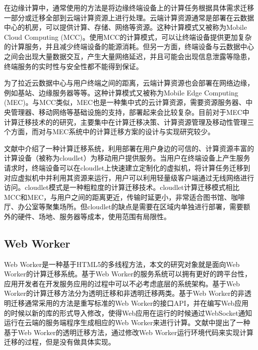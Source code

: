 在边缘计算中，通常使用的方法是将边缘终端设备上的计算任务根据具体需求迁移一部分或迁移全部到云端计算资源上进行处理。云端计算资源通常是部署在云数据中心的机房，可以提供计算、存储、网络等资源。这种计算模式又被称为Mobile Cloud Computing (MCC)\cite{barbarossa2014communicating}。使用MCC的计算模式，可以让终端设备提供更加复杂的计算服务，并且减少终端设备的能源消耗。但另一方面，终端设备与云数据中心之间会出现大量数据交互，产生大量网络延迟，并且可能会出现信息泄露等隐患，终端服务的实时性与安全性都不能得到保证\cite{shi2016edge}。

为了拉近云数据中心与用户终端之间的距离，云端计算资源也会部署在网络边缘，例如基站、边缘服务器等等。这种计算模式又被称为Mobile Edge Computing (MEC)\cite{董浩2019移动边缘计算环境下服务工作流的计算卸载}。与MCC类似，MEC也是一种集中式的云计算资源，需要资源服务器、中央管理器、移动网络等基础设施的支持，部署起来会比较复杂。目前对于MEC中计算迁移技术的的研究，主要集中在计算迁移决策、计算资源管理及移动性管理三个方面，而对与MEC系统中的计算迁移方案的设计与实现研究较少\cite{谢人超2018移动边缘计算卸载技术综述}。

文献\cite{satyanarayanan2009case}中介绍了一种计算迁移系统，利用部署在用户身边的可信的、计算资源丰富的计算设备（被称为cloudlet）为移动用户提供服务。当用户在终端设备上产生服务请求时，终端设备可以在cloudlet上快速建立定制化的虚拟机，将计算任务迁移到对应虚拟机中并利用其资源来运行，用户可以利用轻量级客户端通过无线网络进行访问\cite{verbelen2012cloudlets}。cloudlet模式是一种粗粒度的计算迁移技术\cite{谢人超2018移动边缘计算卸载技术综述}。cloudlet计算迁移模式相比MCC和MEC，与用户之间的距离更近，传输时延更小，非常适合图书馆、咖啡厅、办公室等聚集场所。但cloudlet的缺点是需要在区域内单独进行部署，需要额外的硬件、场地、服务器等成本，使用范围有局限性\cite{li2014can,zhang2018hybrid}。

\subsection{Web Worker}

Web Worker是一种基于HTML5的多线程方法，本文的研究对象就是面向Web Worker的计算迁移系统。基于Web Worker的服务系统可以拥有更好的跨平台性，应用开发者在开发服务应用的过程中可以不必考虑底层的系统架构\cite{王硕2016嵌入式}。基于Web Worker的计算迁移方法分为透明迁移和非透明迁移两类\cite{wang2018html5}。基于Web Worker的非透明迁移通常采用的方法是重写标准的Web Worker的接口API，并在编写Web应用的时候以新的库的形式导入修改，使得Web应用在运行的时候通过WebSocket通知运行在云端的服务端程序生成相应的Web Worker来进行计算\cite{zbierski2014bring,hwang2014wwf,hwang2014cloud,gong2016wwof,kurumatani2012executing}。文献\cite{zhang2010elastic}中提出了一种基于Web Worker的透明迁移方法，通过修改Web Worker运行环境代码来实现计算迁移的过程，但是没有做具体实现。

